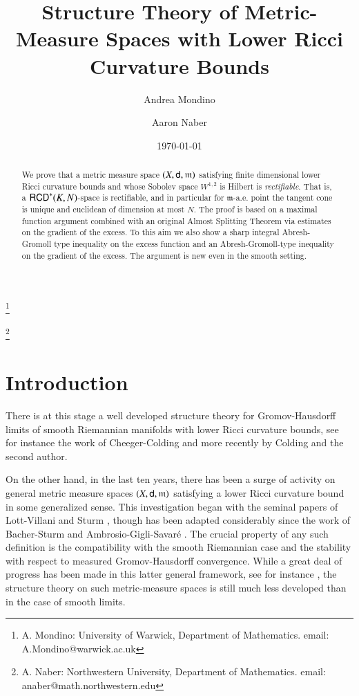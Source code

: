 \documentclass[11pt,reqno]{amsart}
\newcommand{\mm}{\mathfrak m}
\newcommand{\sfd}{{\sf d}}
\newcommand{\RCD}{{\sf RCD}}
\theoremstyle{definition}
\theoremstyle{remark}
\theoremstyle{remark}
\theoremstyle{remark}
\theoremstyle{remark}
\theoremstyle{remark}
\theoremstyle{remark}
\theoremstyle{remark}
\begin{document}
\title{Structure Theory of Metric-Measure Spaces with Lower Ricci Curvature Bounds}

\author{Andrea Mondino}\thanks{A. Mondino: University of Warwick, Department of Mathematics. email: A.Mondino@warwick.ac.uk} 
\author{ Aaron Naber} \thanks{A. Naber:  Northwestern University, Department of Mathematics. email: anaber@math.northwestern.edu}

\date{\today}
\maketitle

\begin{abstract} We prove that a metric measure space $(X,\sfd,\mm)$ satisfying finite dimensional lower Ricci curvature bounds and whose Sobolev space $W^{1,2}$ is Hilbert is \emph{rectifiable}.  That is, a $\RCD^*(K,N)$-space is rectifiable, and in particular for $\mm$-a.e. point the  tangent cone is unique and euclidean of dimension at most $N$.  The proof is based on a maximal function argument combined with an original Almost Splitting Theorem via estimates on the gradient of the excess.   To this aim we also show a sharp integral Abresh-Gromoll type inequality on the excess function and an Abresh-Gromoll-type inequality on the gradient of the excess.  The argument is new even in the smooth setting. 

\end{abstract}


\tableofcontents

\section{Introduction}\label{s:introduction}

There is at this stage  a well developed structure theory for Gromov-Hausdorff limits of smooth Riemannian manifolds with lower Ricci curvature bounds, see for instance the work of Cheeger-Colding \cite{CC96, CC97,CC00a, CC00b} and  more recently \cite{CN} by Colding and the second author.  

On the other hand, in the last ten years, there has been a surge of activity on general metric measure spaces $(X,\sfd,\mm)$ satisfying a lower Ricci curvature bound in some generalized sense. This investigation began with the seminal papers of Lott-Villani \cite{Lott-Villani09}  and Sturm \cite{Sturm06I, Sturm06II}, though has been adapted considerably since the work of Bacher-Sturm \cite{BS2010} and Ambrosio-Gigli-Savar\'e \cite{AGS11a, AGS11b}.  The crucial property of any such definition is the compatibility with the smooth Riemannian case and the stability with respect to  measured Gromov-Hausdorff convergence.
While a great deal of progress has been made in this latter general framework, see for instance  \cite{AGMR2012, AGS11a, AGS11b, AGS12, AMS2013, AMSLocToGlob, BS2010,Cavalletti12, CS12,EKS2013, GaMo,Gigli12,GigliSplitting,GMS2013,GMR2013,GiMo12,R2011,R2013,Savare13,Villani09}, the structure theory on such metric-measure spaces is still much less developed than in the case of smooth limits.  
\end{document}
